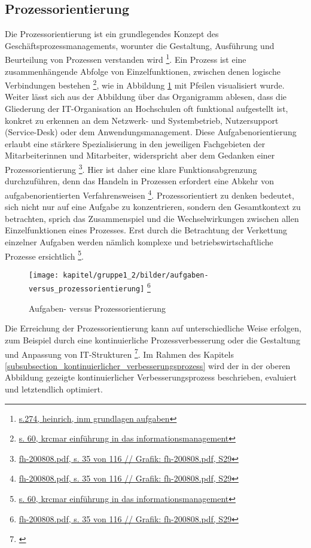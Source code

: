 \subsection{Prozessorientierung}
\label{subsection_prozessorientierung}
Die Prozessorientierung ist ein grundlegendes Konzept des Geschäftsprozessmanagements, worunter die Gestaltung, Ausführung und Beurteilung von Prozessen verstanden wird \footnote{\url{s.274, heinrich, inm grundlagen aufgaben}}. Ein Prozess ist eine zusammenhängende Abfolge von Einzelfunktionen, zwischen denen logische Verbindungen bestehen \footnote{\url{s. 60, krcmar einführung in das informationsmanagement}}, wie in Abbildung \ref{fig_aufgaben_vs_prozess} mit Pfeilen visualisiert wurde. Weiter lässt sich aus der Abbildung über das Organigramm ablesen, dass die Gliederung der IT-Organisation an Hochschulen oft funktional aufgestellt ist, konkret zu erkennen an dem Netzwerk- und Systembetrieb, Nutzersupport (Service-Desk) oder dem Anwendungsmanagement. Diese Aufgabenorientierung erlaubt eine stärkere Spezialisierung in den jeweiligen Fachgebieten der Mitarbeiterinnen und Mitarbeiter, widerspricht aber dem Gedanken einer Prozessorientierung \footnote{\url{fh-200808.pdf, s. 35 von 116 // Grafik: fh-200808.pdf, S29}}. Hier ist daher eine klare Funktionsabgrenzung durchzuführen, denn das Handeln in Prozessen erfordert eine Abkehr von aufgabenorientierten Verfahrensweisen \footnote{\url{fh-200808.pdf, s. 35 von 116 // Grafik: fh-200808.pdf, S29}}. Prozessorientiert zu denken bedeutet, sich nicht nur auf eine Aufgabe zu konzentrieren, sondern den Gesamtkontext zu betrachten, sprich das Zusammenspiel und die Wechselwirkungen zwischen allen Einzelfunktionen eines Prozesses. Erst durch die Betrachtung der Verkettung einzelner Aufgaben werden nämlich komplexe und betriebswirtschaftliche Prozesse ersichtlich \footnote{\url{s. 60, krcmar einführung in das informationsmanagement}}. 

\begin{figure}[h!]
	\centering
	\texttt{[image: kapitel/gruppe1\_2/bilder/aufgaben-versus\_prozessorientierung]} 
	\footnote{\url{fh-200808.pdf, s. 35 von 116 // Grafik: fh-200808.pdf, S29}}
	\caption{Aufgaben- versus Prozessorientierung}
	\label{fig_aufgaben_vs_prozess}
\end{figure}


Die Erreichung der Prozessorientierung kann auf unterschiedliche Weise erfolgen, zum Beispiel durch eine kontinuierliche Prozessverbesserung oder die Gestaltung und Anpassung von IT-Strukturen \footnote{\url{}}. Im Rahmen des Kapitels \ref{subsubsection_kontinuierlicher_verbesserungsprozess}  wird der in der oberen Abbildung gezeigte kontinuierlicher Verbesserungsprozess beschrieben, evaluiert und letztendlich optimiert.



